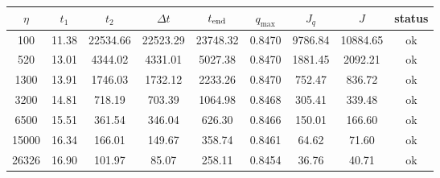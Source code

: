 \begin{tabular}{ccccccccc}
\toprule
$\eta$ & $t_1$ & $t_2$ & $\Delta t$ & $t_{\rm end}$ & $q_{\max}$ & $J_q$ & $J$ & status \\
\midrule
100 & 11.38 & 22534.66 & 22523.29 & 23748.32 & 0.8470 & 9786.84 & 10884.65 & ok \\
520 & 13.01 & 4344.02 & 4331.01 & 5027.38 & 0.8470 & 1881.45 & 2092.21 & ok \\
1300 & 13.91 & 1746.03 & 1732.12 & 2233.26 & 0.8470 & 752.47 & 836.72 & ok \\
3200 & 14.81 & 718.19 & 703.39 & 1064.98 & 0.8468 & 305.41 & 339.48 & ok \\
6500 & 15.51 & 361.54 & 346.04 & 626.30 & 0.8466 & 150.01 & 166.60 & ok \\
15000 & 16.34 & 166.01 & 149.67 & 358.74 & 0.8461 & 64.62 & 71.60 & ok \\
26326 & 16.90 & 101.97 & 85.07 & 258.11 & 0.8454 & 36.76 & 40.71 & ok \\
\bottomrule
\end{tabular}
